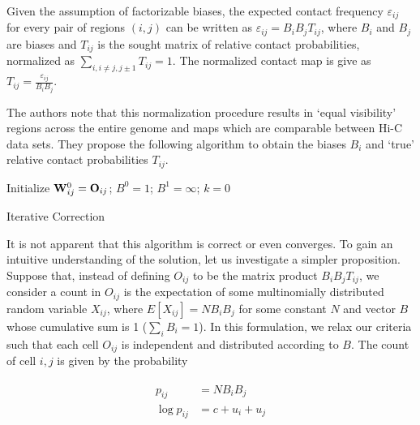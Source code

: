 \begin{prop}
  Given the assumption of factorizable biases, the expected contact frequency $\varepsilon_{ij}$ for every pair of regions $(i,j)$ can
  be written as $\varepsilon_{ij} = B_{i}B_{j}T_{ij}$, where $B_i$ and $B_j$ are biases and $T_{ij}$ is the sought matrix of relative contact
  probabilities, normalized as $\sum_{i, i \neq j, j \pm 1}T_{ij} = 1$.  The normalized contact map is give as
  $T_{ij} = \frac{\varepsilon_{ij}}{B_{i}B_{j}}$.
\end{prop}

The authors note that this normalization procedure results in `equal visibility' regions across the entire genome and maps which are
comparable between Hi-C data sets.  They propose the following algorithm to obtain the biases $B_i$ and `true' relative contact probabilities
$T_{ij}$.

\begin{algorithm}[H]
  Initialize $\mathbf{W}^{0}_{ij} = \mathbf{O}_{ij}$; $B^0 = 1$; $B^1 = \infty$; $k = 0$\;
  \caption{Iterative Correction}
\end{algorithm}

It is not apparent that this algorithm is correct or even converges.  To gain an intuitive understanding of the solution, let us investigate a
simpler proposition.  Suppose that, instead of defining $O_{ij}$ to be the matrix product $B_{i}B_{j}T_{ij}$, we consider a count
in $O_{ij}$ is the expectation of some multinomially distributed random variable $X_{ij}$, where $E[X_{ij}] = NB_{i}B_j$ for some
constant $N$ and vector $B$ whose cumulative sum is 1 ($\sum_{i}B_i = 1$).  In this formulation, we relax our criteria such that each cell
$O_{ij}$ is independent and distributed according to $B$.  The count of cell $i,j$ is given by the probability

\begin{align}
  \label{eqn:probmodel}
  \begin{split}
    p_{ij} &= NB_{i}B_{j}
    \\
    \log{p_{ij}} &=  c + u_i + u_j
  \end{split}
\end{align}

